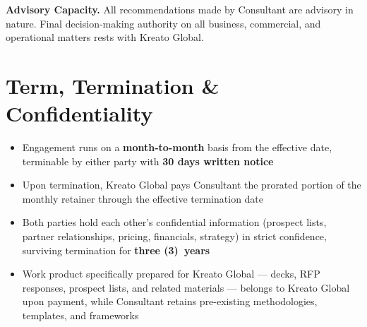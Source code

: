 \documentclass{toospoint}
\begin{document}
\begin{clausebox}
\sffamily\footnotesize\color{TPGray}
\textbf{Advisory Capacity.} All recommendations made by Consultant are advisory
in nature. Final decision-making authority on all business, commercial, and
operational matters rests with Kreato Global.
\end{clausebox}

\section{Term, Termination \& Confidentiality}

\begin{itemize}[leftmargin=1.5em, itemsep=4pt, topsep=4pt]
  \item Engagement runs on a \textbf{month-to-month} basis from the effective date, terminable by either party with \textbf{30 days written notice}
  \item Upon termination, Kreato Global pays Consultant the prorated portion of the monthly retainer through the effective termination date
  \item Both parties hold each other's confidential information (prospect lists, partner relationships, pricing, financials, strategy) in strict confidence, surviving termination for \textbf{three (3)~years}
  \item Work product specifically prepared for Kreato Global --- decks, RFP responses, prospect lists, and related materials --- belongs to Kreato Global upon payment, while Consultant retains pre-existing methodologies, templates, and frameworks
\end{itemize}
\end{document}
